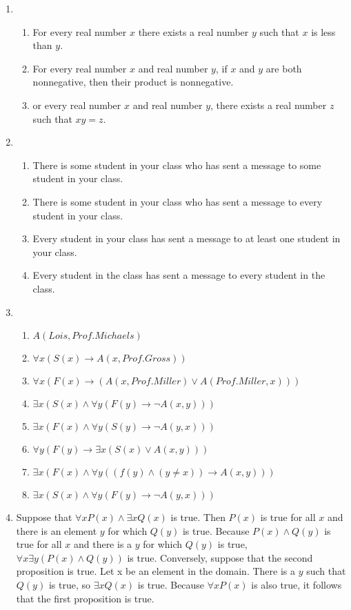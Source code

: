 \documentclass{sig-alternate-05-2015}
\begin{document}
\begin{enumerate}
\item 
\begin{enumerate}
	\item For every real number $x$ there exists a real number $y$
	such that $x$ is less than $y$.
	\item For every real number $x$ and real
	number $y$, if $x$ and $y$ are both nonnegative, then their product
	is nonnegative.
	\item or every real number $x$ and real number
	$y$, there exists a real number $z$ such that $xy = z$.
\end{enumerate}

\item 
\begin{enumerate}
	\item There is some student in your class who has sent a message to
	some student in your class.
	\item There is some student in your
	class who has sent a message to every student in your class.
	\item Every student in your class has sent a message to at least
	one student in your class.
	\item Every student in the class
	has sent a message to every student in the class.
\end{enumerate}

\item 
\begin{enumerate}
	\item $A(Lois, Prof. Michaels)$
	\item $\forall x (S(x) \rightarrow A(x, Prof. Gross))$
	\item $\forall x (F(x) \rightarrow (A(x, Prof. Miller) \vee A(Prof. Miller, x)))$
	\item $\exists x (S(x) \wedge \forall y (F(y) \rightarrow \neg A(x, y)))$
	\item $\exists x (F(x) \wedge \forall y (S(y) \rightarrow \neg A(y, x)))$
	\item $\forall y (F(y) \rightarrow \exists x (S(x) \vee A(x, y)))$
	\item $\exists x (F(x) \wedge \forall y ((f(y) \wedge (y \ne x)) \rightarrow A(x, y)))$
	\item $\exists x (S(x) \wedge \forall y (F(y) \rightarrow \neg A(y, x)))$
\end{enumerate}
	
\item Suppose that $\forall x P(x) \wedge \exists x Q(x)$ is true. Then $P(x)$ is true for all $x$ and there is an element $y$ for which $Q(y)$ is true.
Because $P(x) \wedge Q(y)$ is true for all $x$ and there is a $y$ for which
$Q(y)$ is true, $\forall x \exists y (P(x) \wedge Q(y))$ is true. Conversely, suppose
that the second proposition is true. Let x be an element
in the domain. There is a $y$ such that $Q(y)$ is true, so $\exists x Q(x)$
is true. Because $\forall x P(x)$ is also true, it follows that the first
proposition is true.
	

\end{enumerate}
\end{document}
